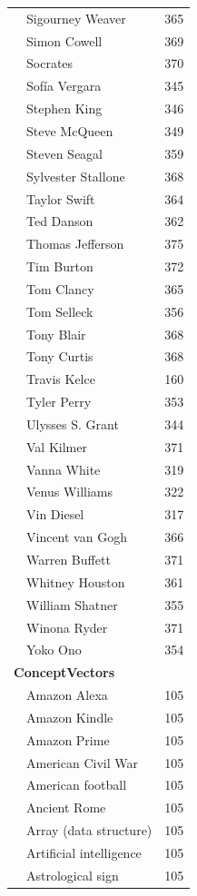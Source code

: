 \documentclass{article}
\begin{document}
{\begin{longtable}{p{}p{}r}
 & Sigourney Weaver & 365 \\
 & Simon Cowell & 369 \\
 & Socrates & 370 \\
 & Sof\'ia Vergara & 345 \\
 & Stephen King & 346 \\
 & Steve McQueen & 349 \\
 & Steven Seagal & 359 \\
 & Sylvester Stallone & 368 \\
 & Taylor Swift & 364 \\
 & Ted Danson & 362 \\
 & Thomas Jefferson & 375 \\
 & Tim Burton & 372 \\
 & Tom Clancy & 365 \\
 & Tom Selleck & 356 \\
 & Tony Blair & 368 \\
 & Tony Curtis & 368 \\
 & Travis Kelce & 160 \\
 & Tyler Perry & 353 \\
 & Ulysses S. Grant & 344 \\
 & Val Kilmer & 371 \\
 & Vanna White & 319 \\
 & Venus Williams & 322 \\
 & Vin Diesel & 317 \\
 & Vincent van Gogh & 366 \\
 & Warren Buffett & 371 \\
 & Whitney Houston & 361 \\
 & William Shatner & 355 \\
 & Winona Ryder & 371 \\
 & Yoko Ono & 354 \\
\multicolumn{3}{l}{\textbf{ConceptVectors}} \\
 & Amazon Alexa & 105 \\
 & Amazon Kindle & 105 \\
 & Amazon Prime & 105 \\
 & American Civil War & 105 \\
 & American football & 105 \\
 & Ancient Rome & 105 \\
 & Array (data structure) & 105 \\
 & Artificial intelligence & 105 \\
 & Astrological sign & 105 \\

\end{longtable}}
\end{document}
